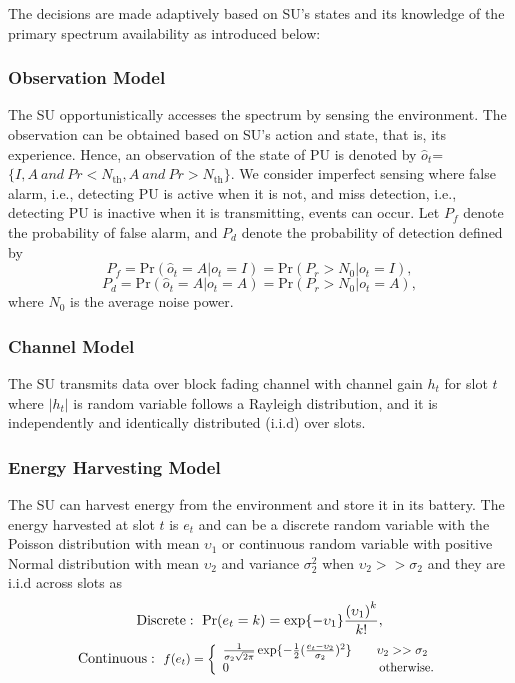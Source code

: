 \documentclass[journal]{IEEEtran}
\begin{document}
		The decisions are made adaptively based on SU’s states and its knowledge of the primary spectrum availability as introduced below:
	\subsubsection{Observation Model}
		The SU opportunistically accesses the spectrum by sensing the environment. The observation can be obtained based on SU's action and state, that is, its experience. Hence, an observation of the state of PU is denoted by $\hat o_t$=$\{I,A~and~Pr<N_{\text{th}},A~and~Pr>N_{\text{th}}\}$. We consider imperfect sensing where false alarm, i.e., detecting PU is active when it is not, and miss detection, i.e., detecting PU is inactive when it is transmitting, events can occur. Let $P_f$ denote the probability of false alarm, and $P_d$ denote the probability of detection defined by
		\begin{equation}
			{P_f} = \text{Pr} ({\hat o_{t}} = A|{o_t} = I)= \text{Pr} ({P_r} > {N_0}|{o_t} = I),
		\end{equation}
		\begin{equation}
			{P_d} = \text{Pr} ({\hat o_{t}} = A|{o_t} = A)= \text{Pr} ({P_r} > {N_0}|{o_t} = A),
		\end{equation}
		where $N_0$ is the average noise power.
	\subsubsection{Channel Model}
		The SU transmits data over block fading channel with channel gain $h_t$ for slot $t$ where $\left| {{h_t}} \right|$ is random variable follows a Rayleigh distribution, and it is independently and identically distributed (i.i.d) over slots.
	
	\subsubsection{Energy Harvesting Model}
		The SU can harvest energy from the environment and store it in its battery. The energy harvested at slot $t$ is $e_t$ and can be a discrete random variable with the Poisson distribution with mean ${\upsilon _1}$ or continuous random variable with positive Normal distribution with mean ${\upsilon _2}$ and variance ${\sigma _2^2}$ when ${\upsilon _2}>>{\sigma _2}$ and they are i.i.d across slots as
		\begin{equation}
				\text{Discrete}:~{\rm{Pr}}({e_t} = k) = \exp \{  - {\upsilon _1}\} \frac{{{{({\upsilon _1})}^k}}}{{k!}},
		\end{equation}
		\begin{equation}
				\text{Continuous}:~\scalebox{0.89} {$f({e_t}) = \left\{ \begin{array}{l}
					\frac{1}{{{\sigma _2}\sqrt {2\pi } }}\exp \{  - \frac{1}{2}{(\frac{{{e_t} - {\upsilon _2}}}{{{\sigma _2}}})^2}\} ~~~~~~ {\upsilon _2} >> {\sigma _2}\;\\
					0 \hspace{4.25cm} \text{otherwise}.
				\end{array} \right.$}
		\end{equation}
\end{document}
